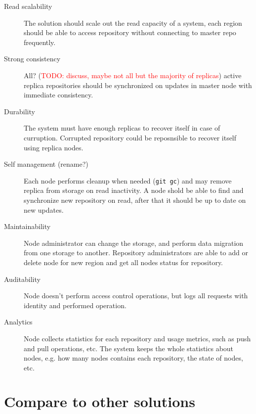 \documentclass[12pt,oneside]{article}
\newcommand{\code}[1]{\texttt{#1}}
\newcommand{\todo}[1]{\textcolor{red}{TODO: #1}}
\begin{document}
\begin{description}
  \item[Read scalability]
    The solution should scale out the read capacity of a system, each region should be able
    to access repository without connecting to master repo frequently.
  \item[Strong consistency]
    All? (\todo{discuss, maybe not all but the majority of replicas})
    active replica repositories should be synchronized on updates in master node
    with immediate consistency.
  \item[Durability]
    The system must have enough replicas to recover itself in case of curruption.
    Corrupted repository could be reposnsible to recover itself using replica nodes.
  \item[Self management (rename?)]
    Each node performs cleanup when needed (\code{git gc}) and may remove replica
    from storage on read inactivity.
    A node shold be able to find and synchronize new repository on read,
    after that it should be up to date on new updates.
  \item[Maintainability]
    Node administrator can change the storage, and perform data migration from one storage
    to another.
    Repository administrators are able to add or delete node for new region and
    get all nodes status for repository.
  \item[Auditability]
    Node doesn't perform access control operations, but logs all
    requests with identity and performed operation.
  \item[Analytics]
    Node collects statistics for each repository and usage metrics, such as
    push and pull operations, etc. The system keeps the whole statistics about
    nodes, e.g. how many nodes contains each repository, the state of nodes, etc.
\end{description}


\section{Compare to other solutions}
\end{document}

